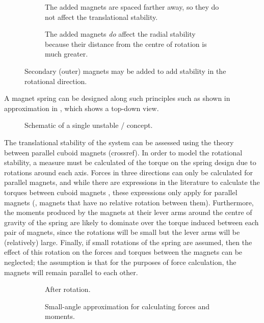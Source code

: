 \documentclass[11pt,a4paper]{memoir}
\begin{document}
\begin{figure}
  \begin{subfigure}
    \caption{
     The added magnets are spaced farther away,
     so they do not affect the
     translational stability.
     }
  \end{subfigure}
  \begin{subfigure}
    \caption{
      The added magnets \emph{do} affect the radial stability
      because their distance from the centre of rotation is much greater.
      }
  \end{subfigure}
  \caption{Secondary (outer) magnets may be added to add stability
      in the rotational direction.}
\end{figure}

A magnet spring can be designed along such principles such as shown in
approximation in , which shows a top-down view.

\begin{figure}
  \caption{Schematic of a single unstable \dof/ concept.}
\end{figure}

The translational stability of the system can be assessed using the theory between parallel cuboid magnets (crossref).
In order to model the rotational stability, a measure must be calculated of the torque on the spring design due to rotations around each axis.
Forces in three directions can only be calculated for parallel magnets, and while there are expressions in the literature to calculate the torques between cuboid magnets \cite{janssen2010-ietm}, these expressions only apply for parallel magnets (\ie, magnets that have no relative rotation between them).
Furthermore, the moments produced by the magnets at their lever arms around the centre of gravity of the spring are likely to dominate over the torque induced between each pair of magnets, since the rotations will be small but the lever arms will be (relatively) large.
Finally, if small rotations of the spring are assumed, then the effect of this rotation on the forces and torques between the magnets can be neglected; the assumption is that for the purposes of force calculation, the magnets will remain parallel to each other.

\begin{figure}
  \begin{wide}
    \begin{subfigure}[0.4]
      \caption{After rotation.}
    \end{subfigure}\hfil
    \begin{subfigure}[0.4]
      \caption{Small-angle approximation for calculating forces and moments.}
    \end{subfigure}
  \end{wide}
  \caption{}
\end{figure}
\end{document}
